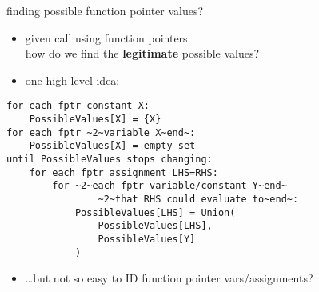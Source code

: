 \begin{frame}[fragile,label=fptrValues]{finding possible function pointer values?}
\begin{itemize}
\item given call using function pointers \\
how do we find the \textbf{legitimate} possible values?
\item one high-level idea:
\end{itemize}
\begin{lstlisting}[language={},style=smaller,
    moredelim={**[is][\btHL<2-|handout:0>]{~2~}{~end~}},
]
for each fptr constant X:
    PossibleValues[X] = {X}
for each fptr ~2~variable X~end~:
    PossibleValues[X] = empty set
until PossibleValues stops changing:
    for each fptr assignment LHS=RHS:
        for ~2~each fptr variable/constant Y~end~
                ~2~that RHS could evaluate to~end~:
            PossibleValues[LHS] = Union(
                PossibleValues[LHS],
                PossibleValues[Y]
            )
\end{lstlisting}
\begin{itemize}
\item \ldots but not so easy to ID function pointer vars/assignments?
\end{itemize}
\end{frame}

